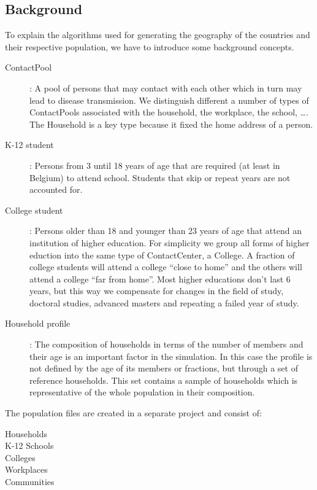 \subsection{Background}
\label{subsection:background}

To explain the algorithms used for generating the geography of the countries and their respective population, we have to introduce some background concepts. 

\begin{description}
    \item[ContactPool]:
        A pool of persons that may contact with each other which in turn may lead to disease transmission.
        We distinguish different a number of types of ContactPools associated with the household, the workplace, 
        the school, \ldots. The Household is a key type because it fixed the home address of a person.
    \item[K-12 student]: 
    	Persons from 3 until 18 years of age that are required (at least in Belgium) to attend school. 
    	Students that skip or repeat years are not accounted for.
    \item[College student]:
        Persons older than 18 and younger than 23 years of age that attend an institution of higher education. 
        For simplicity we group all forms of higher eduction into the same type of ContactCenter, a College. 
        A fraction of college students will attend a college ``close to home'' and the others will attend a 
        college ``far from home''. Most higher educations don't last 6 years, but this way we compensate 
        for changes in the field of study, doctoral studies, advanced masters and repeating a failed year of study.
       \item[Household profile]:
        The composition of households in terms of the number of members and their age is an important 
        factor in the simulation. In this case the profile is not defined by the age of its members or fractions, 
        but through a set of reference households. This set contains a sample of households which is 
        representative of the whole population in their composition.
\end{description}


The population files are created in a separate project and consist of:

\begin{description}
    \item[Households]
    \item[K-12 Schools]
    \item[Colleges]  
    \item[Workplaces]        
    \item[Communities]
        
\end{description}



